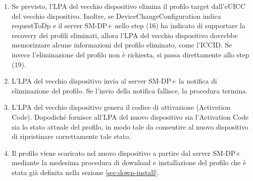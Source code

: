 \documentclass[10pt, oneside]{book}
\begin{document}
\begin{enumerate}
\item Se previsto, l'LPA del vecchio dispositivo elimina il profilo target dall'eUICC del vecchio dispositivo. Inoltre, se DeviceChangeConfiguration indica requestToDp e il server SM-DP+ nello step (16) ha indicato di supportare la recovery dei profili eliminati, allora l'LPA del vecchio dispositivo dovrebbe memorizzare alcune informazioni del profilo eliminato, come l'ICCID. Se invece l'eliminazione del profilo non è richiesta, si passa direttamente allo step (19).
\item L'LPA del vecchio dispositivo invia al server SM-DP+ la notifica di eliminazione del profilo. Se l'invio della notifica fallisce, la procedura termina.
\item L'LPA del vecchio dispositivo genera il codice di attivazione (Activation Code). Dopodiché fornisce all'LPA del nuovo dispositivo sia l'Activation Code sia lo stato attuale del profilo, in modo tale da consentire al nuovo dispositivo di ripristinare correttamente tale stato.
\item Il profilo viene scaricato nel nuovo dispositivo a partire dal server SM-DP+ mediante la medesima procedura di download e installazione del profilo che è stata già definita nella sezione \ref{sec:down-install}.
\end{enumerate}
\end{document}
